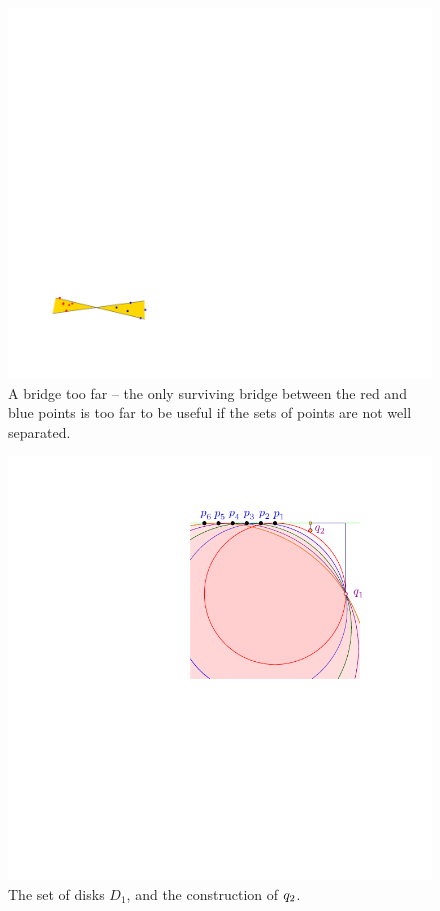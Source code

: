 \documentclass[12pt]{article}%
\begin{document}
\begin{figure}[h]
    \includegraphics[page=3]{figs/bad_example} \hfill%
    \phantom{}
    \caption{A bridge too far -- the only surviving bridge between the
       red and blue points is too far to be useful if the sets of
       points are not well separated.}
\end{figure}

\begin{figure}[h]
    \centering%
    \includegraphics{figs/lower_bound}%
    \caption{The set of disks $D_1$, and the construction of $q_2$.}
\end{figure}
\end{document}
